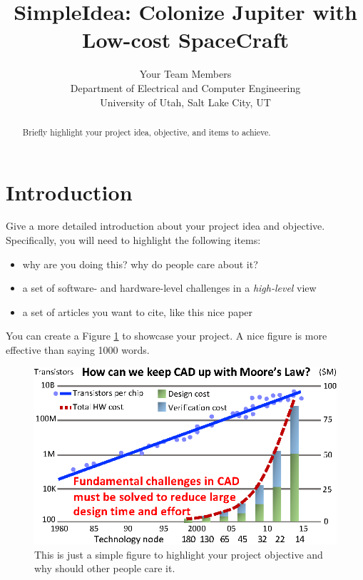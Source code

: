 \documentclass[conference, final]{IEEEtran}
\begin{document}
\title{SimpleIdea: Colonize Jupiter with Low-cost SpaceCraft}

\author{
    Your Team Members\\
    Department of Electrical and Computer Engineering\\
    University of Utah, Salt Lake City, UT\\
}

\date{}
\maketitle

\thispagestyle{empty}

\begin{abstract}
Briefly highlight your project idea, objective, and items to achieve.
\end{abstract}

\section{Introduction}

Give a more detailed introduction about your project idea and objective.
Specifically, you will need to highlight the following items:

\begin{itemize}

\item why are you doing this? why do people care about it?
\item a set of software- and hardware-level challenges in a \textit{high-level} view
\item a set of articles you want to cite, like this nice paper~\cite{nicepaper1}


\end{itemize}

You can create a Figure \ref{fig::intro} to showcase your project.
A nice figure is more effective than saying 1000 words.

\begin{figure}[h]
  \centering
  \centerline{\includegraphics[width=1.\columnwidth]{Fig/intro.eps}}
  \caption{This is just a simple figure to highlight your project objective and why 
  should other people care it.}
  \label{fig::intro}
\end{figure}
\end{document}
